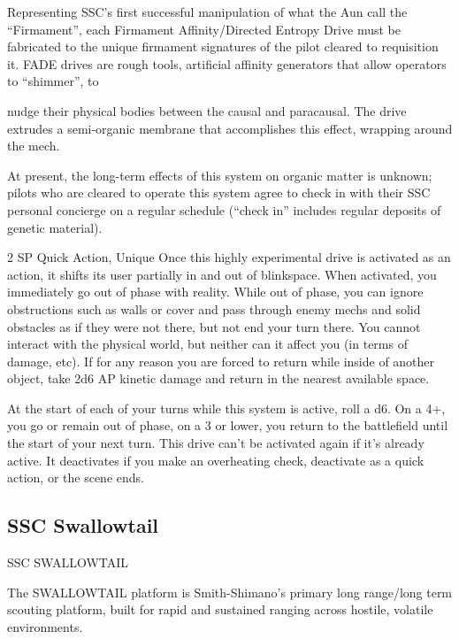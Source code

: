 Representing SSC’s first successful manipulation of what the Aun call the “Firmament”, each Firmament  
Affinity/Directed Entropy Drive must be fabricated to the unique firmament signatures of the pilot cleared to  
requisition it. FADE drives are rough tools, artificial affinity generators that allow operators to “shimmer”, to  

nudge their physical bodies between the causal and paracausal. The drive extrudes a semi-organic  
membrane that accomplishes this effect, wrapping around the mech.  

At present, the long-term effects of this system on organic matter is unknown; pilots who are cleared to  
operate this system agree to check in with their SSC personal concierge on a regular schedule (“check in”  
includes regular deposits of genetic material).  

2 SP  
Quick Action, Unique  
Once this highly experimental drive is activated as an action, it shifts its user partially in and out  
of blinkspace. When activated, you immediately go out of phase with reality. While out of phase,  
you can ignore obstructions such as walls or cover and pass through enemy mechs and solid  
obstacles as if they were not there, but not end your turn there. You cannot interact with the  
physical world, but neither can it affect you (in terms of damage, etc). If for any reason you are  
forced to return while inside of another object, take 2d6 AP kinetic damage and return in the  
nearest available space. 
 

At the start of each of your turns while this system is active, roll a d6. On a 4+, you go or remain  
out of phase, on a 3 or lower, you return to the battlefield until the start of your next turn. This  
drive can’t be activated again if it’s already active. It deactivates if you make an overheating  
check, deactivate as a quick action, or the scene ends.
 

                                                                                                             
\subsection{SSC Swallowtail}

                                                           
                                          SSC SWALLOWTAIL  

The SWALLOWTAIL platform is Smith-Shimano’s primary long range/long term scouting platform,  
built for rapid and sustained ranging across hostile, volatile environments.   

